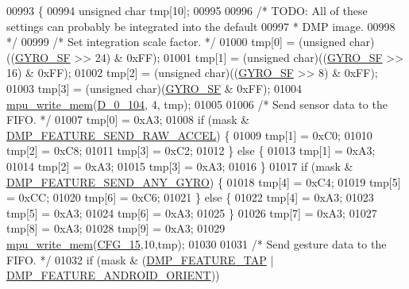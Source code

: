 \begin{DoxyCode}
00993 \{
00994     \textcolor{keywordtype}{unsigned} \textcolor{keywordtype}{char} tmp[10];
00995 
00996     \textcolor{comment}{/* TODO: All of these settings can probably be integrated into the default}
00997 \textcolor{comment}{     * DMP image.}
00998 \textcolor{comment}{     */}
00999     \textcolor{comment}{/* Set integration scale factor. */}
01000     tmp[0] = (\textcolor{keywordtype}{unsigned} char)((\hyperlink{group___d_r_i_v_e_r_s_gac0325c658f2911bdfc3b44fca31c684f}{GYRO\_SF} >> 24) & 0xFF);
01001     tmp[1] = (\textcolor{keywordtype}{unsigned} char)((\hyperlink{group___d_r_i_v_e_r_s_gac0325c658f2911bdfc3b44fca31c684f}{GYRO\_SF} >> 16) & 0xFF);
01002     tmp[2] = (\textcolor{keywordtype}{unsigned} char)((\hyperlink{group___d_r_i_v_e_r_s_gac0325c658f2911bdfc3b44fca31c684f}{GYRO\_SF} >> 8) & 0xFF);
01003     tmp[3] = (\textcolor{keywordtype}{unsigned} char)(\hyperlink{group___d_r_i_v_e_r_s_gac0325c658f2911bdfc3b44fca31c684f}{GYRO\_SF} & 0xFF);
01004     \hyperlink{group___d_r_i_v_e_r_s_gafea59910bc3dd30ba3356b1c75213a5f}{mpu\_write\_mem}(\hyperlink{group___d_r_i_v_e_r_s_ga5edbce4fdd515aa31a227fb8eaf0151f}{D\_0\_104}, 4, tmp);
01005 
01006     \textcolor{comment}{/* Send sensor data to the FIFO. */}
01007     tmp[0] = 0xA3;
01008     \textcolor{keywordflow}{if} (mask & \hyperlink{group___d_r_i_v_e_r_s_ga9eeb257febe4a305df7ad4cf31dc2755}{DMP\_FEATURE\_SEND\_RAW\_ACCEL}) \{
01009         tmp[1] = 0xC0;
01010         tmp[2] = 0xC8;
01011         tmp[3] = 0xC2;
01012     \} \textcolor{keywordflow}{else} \{
01013         tmp[1] = 0xA3;
01014         tmp[2] = 0xA3;
01015         tmp[3] = 0xA3;
01016     \}
01017     \textcolor{keywordflow}{if} (mask & \hyperlink{group___d_r_i_v_e_r_s_gadda8f4118bd084cfb4fcda3571585c56}{DMP\_FEATURE\_SEND\_ANY\_GYRO}) \{
01018         tmp[4] = 0xC4;
01019         tmp[5] = 0xCC;
01020         tmp[6] = 0xC6;
01021     \} \textcolor{keywordflow}{else} \{
01022         tmp[4] = 0xA3;
01023         tmp[5] = 0xA3;
01024         tmp[6] = 0xA3;
01025     \}
01026     tmp[7] = 0xA3;
01027     tmp[8] = 0xA3;
01028     tmp[9] = 0xA3;
01029     \hyperlink{group___d_r_i_v_e_r_s_gafea59910bc3dd30ba3356b1c75213a5f}{mpu\_write\_mem}(\hyperlink{group___d_r_i_v_e_r_s_ga1fe6e4489855269e7197beb38b07c723}{CFG\_15},10,tmp);
01030 
01031     \textcolor{comment}{/* Send gesture data to the FIFO. */}
01032     \textcolor{keywordflow}{if} (mask & (\hyperlink{group___d_r_i_v_e_r_s_ga87fac39cf95e2c56afdf507a986fa00b}{DMP\_FEATURE\_TAP} | \hyperlink{group___d_r_i_v_e_r_s_gaf2b250fc928390d562f7bd80300ce419}{DMP\_FEATURE\_ANDROID\_ORIENT}))

\end{DoxyCode}
